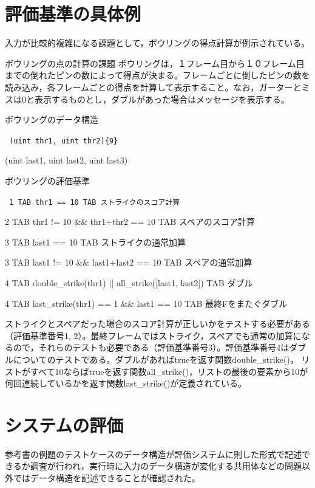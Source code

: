 \documentclass{tpu-sotu}
\begin{document}
\section{評価基準の具体例}
入力が比較的複雑になる課題として，ボウリングの得点計算が例示されている。
\begin{itembox}[l]{ボウリングの点の計算の課題}
ボウリングは，１フレーム目から１０フレーム目までの倒れたピンの数によって得点が決まる。フレームごとに倒したピンの数を読み込み，各フレームごとの得点を計算して表示すること。なお，ガーターとミスは0と表示するものとし，ダブルがあった場合はメッセージを表示する。
\end{itembox}
\begin{minipage}[b]{\textwidth}
\begin{itembox}[l]{ボウリングのデータ構造}
{\tt
(uint thr1, uint thr2)\{9\}

(uint last1, uint last2, uint last3)
}
\end{itembox}
\end{minipage}
\begin{itembox}[l]{ボウリングの評価基準}
{\tt
1 TAB thr1 == 10 TAB ストライクのスコア計算

2 TAB thr1 != 10 \&\& thr1+thr2 == 10 TAB スペアのスコア計算

3 TAB last1 == 10 TAB ストライクの通常加算

3 TAB last1 != 10  \&\& last1+last2 == 10 TAB スペアの通常加算

4 TAB double\_strike(thr1) || all\_strike([last1, last2]) TAB ダブル

4 TAB last\_strike(thr1) == 1 \&\& last1 == 10 TAB 最終Fをまたぐダブル
}
\end{itembox}

ストライクとスペアだった場合のスコア計算が正しいかをテストする必要がある（評価基準番号1, 2）。最終フレームではストライク，スペアでも通常の加算になるので，それらのテストも必要である（評価基準番号3）。評価基準番号4はダブルについてのテストである。ダブルがあればtrueを返す関数double\_strike()， リストがすべて10ならばtrueを返す関数all\_strike()，リストの最後の要素から10が何回連続しているかを返す関数last\_strike()が定義されている。
\section{システムの評価}
参考書の例題のテストケースのデータ構造が評価システムに則した形式で記述できるか調査が行われ，実行時に入力のデータ構造が変化する共用体などの問題以外ではデータ構造を記述できることが確認された。
\end{document}

